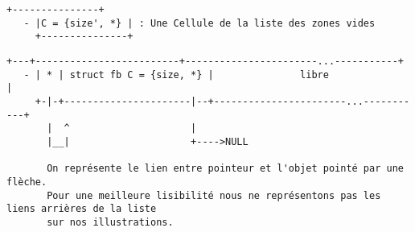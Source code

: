\documentclass[11pt]{article}
\theoremstyle{definition}
\begin{document}
\begin{lstlisting}[columns=fixed,basicstyle=\scriptsize\ttfamily]
     +---------------+
   - |C = {size', *} | : Une Cellule de la liste des zones vides
     +---------------+
\end{lstlisting}

\begin{lstlisting}[columns=fixed,basicstyle=\scriptsize\ttfamily]
     +---+-------------------------+-----------------------...-----------+
   - | * | struct fb C = {size, *} |               libre                 |
     +-|-+----------------------|--+-----------------------...-----------+
       |  ^                     |
       |__|                     +---->NULL

       On représente le lien entre pointeur et l'objet pointé par une flèche.
       Pour une meilleure lisibilité nous ne représentons pas les liens arrières de la liste
       sur nos illustrations.
\end{lstlisting}
\end{document}
